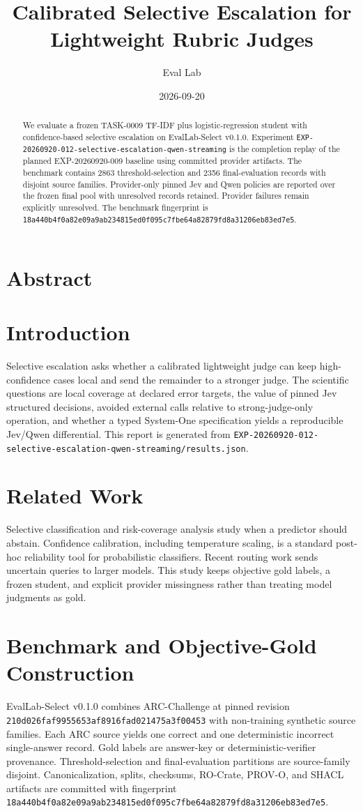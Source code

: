 \documentclass[11pt]{article}
\title{Calibrated Selective Escalation for Lightweight Rubric Judges}
\author{Eval Lab}
\date{2026-09-20}
\begin{document}
\maketitle
\section*{Abstract}
\begin{abstract}
We evaluate a frozen TASK-0009 TF-IDF plus logistic-regression student with confidence-based selective escalation on EvalLab-Select v0.1.0. Experiment \texttt{EXP-20260920-012-selective-escalation-qwen-streaming} is the completion replay of the planned EXP-20260920-009 baseline using committed provider artifacts. The benchmark contains 2863 threshold-selection and 2356 final-evaluation records with disjoint source families. Provider-only pinned Jev and Qwen policies are reported over the frozen final pool with unresolved records retained. Provider failures remain explicitly unresolved. The benchmark fingerprint is \texttt{18a440b4f0a82e09a9ab234815ed0f095c7fbe64a82879fd8a31206eb83ed7e5}.
\end{abstract}
\section{Introduction}
Selective escalation asks whether a calibrated lightweight judge can keep high-confidence cases local and send the remainder to a stronger judge. The scientific questions are local coverage at declared error targets, the value of pinned Jev structured decisions, avoided external calls relative to strong-judge-only operation, and whether a typed System-One specification yields a reproducible Jev/Qwen differential. This report is generated from \texttt{EXP-20260920-012-selective-escalation-qwen-streaming/results.json}.
\section{Related Work}
Selective classification and risk-coverage analysis study when a predictor should abstain. Confidence calibration, including temperature scaling, is a standard post-hoc reliability tool for probabilistic classifiers. Recent routing work sends uncertain queries to larger models. This study keeps objective gold labels, a frozen student, and explicit provider missingness rather than treating model judgments as gold.
\section{Benchmark and Objective-Gold Construction}
EvalLab-Select v0.1.0 combines ARC-Challenge at pinned revision \texttt{210d026faf9955653af8916fad021475a3f00453} with non-training synthetic source families. Each ARC source yields one correct and one deterministic incorrect single-answer record. Gold labels are answer-key or deterministic-verifier provenance. Threshold-selection and final-evaluation partitions are source-family disjoint. Canonicalization, splits, checksums, RO-Crate, PROV-O, and SHACL artifacts are committed with fingerprint \texttt{18a440b4f0a82e09a9ab234815ed0f095c7fbe64a82879fd8a31206eb83ed7e5}.
\end{document}
